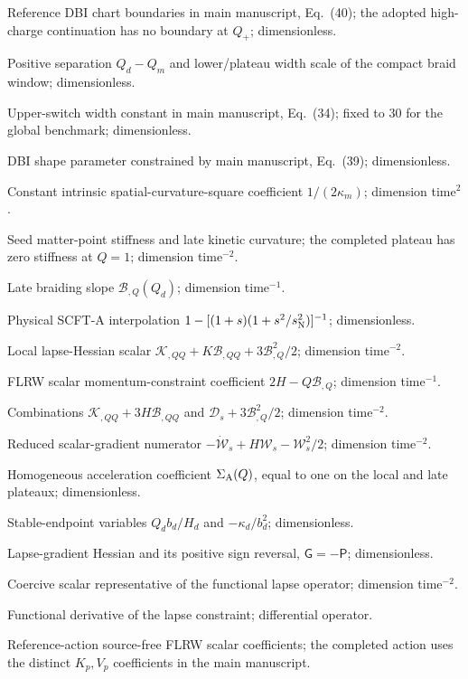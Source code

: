 \documentclass[aps,prd,reprint,onecolumn,notitlepage,nofootinbib,longbibliography,floatfix]{revtex4-2}
\theoremstyle{scstyle}
\theoremstyle{definition}
\theoremstyle{remark}
\newcommand{\cK}{\mathcal K}
\newcommand{\cB}{\mathcal B}
\newcommand{\cD}{\mathcal D}
\newcommand{\kap}{\kappa_m}
\newcommand{\etaR}{\eta_R}
\begin{document}
\begin{description}[style=nextline,leftmargin=3.2cm,labelwidth=2.8cm,font=\normalfont\bfseries]
\item[$Q_-,Q_+$] Reference DBI chart boundaries in main manuscript, Eq.~(40); the adopted high-charge continuation has no boundary at $Q_+$; dimensionless.
\item[$\Delta Q$] Positive separation $Q_d-Q_m$ and lower/plateau width scale of the compact braid window; dimensionless.
\item[$\nu_{\rm A}$] Upper-switch width constant in main manuscript, Eq.~(34); fixed to $30$ for the global benchmark; dimensionless.
\item[$\lambda_D$] DBI shape parameter constrained by main manuscript, Eq.~(39); dimensionless.
\item[$\etaR$] Constant intrinsic spatial-curvature-square coefficient $1/(2\kap)$; dimension time$^2$.
\item[$\kappa_m,\kappa_d$] Seed matter-point stiffness and late kinetic curvature; the completed plateau has zero stiffness at $Q=1$; dimension time$^{-2}$.
\item[$b_d$] Late braiding slope $\cB_{,Q}(Q_d)$; dimension time$^{-1}$.
\item[$\mu_{\rm A}(s)$] Physical SCFT-A interpolation $1-[(1+s)(1+s^2/s_{\rm N}^2)]^{-1}$; dimensionless.
\item[$\Xi$] Local lapse-Hessian scalar $\cK_{,QQ}+K\cB_{,QQ}+3\cB_{,Q}^2/2$; dimension time$^{-2}$.
\item[$\mathcal W_s$] FLRW scalar momentum-constraint coefficient $2H-Q\cB_{,Q}$; dimension time$^{-1}$.
\item[$\cD_s,\Xi_s$] Combinations $\cK_{,QQ}+3H\cB_{,QQ}$ and $\cD_s+3\cB_{,Q}^2/2$; dimension time$^{-2}$.
\item[$\mathcal C_s$] Reduced scalar-gradient numerator $-\dot{\mathcal W}_s+H\mathcal W_s-\mathcal W_s^2/2$; dimension time$^{-2}$.
\item[$\sigma_J$] Homogeneous acceleration coefficient $\Sigma_{\rm A}(Q)$, equal to one on the local and late plateaux; dimensionless.
\item[$r_d,\chi_d$] Stable-endpoint variables $Q_db_d/H_d$ and $-\kappa_d/b_d^2$; dimensionless.
\item[$\mathsf P^{ij},\mathsf G^{ij}$] Lapse-gradient Hessian and its positive sign reversal, $\mathsf G=-\mathsf P$; dimensionless.
\item[$\mathscr L_N$] Coercive scalar representative of the functional lapse operator; dimension time$^{-2}$.
\item[$\Delta_N$] Functional derivative of the lapse constraint; differential operator.
\item[$Q_s,F_s,c_s^2$] Reference-action source-free FLRW scalar coefficients; the completed action uses the distinct $K_p,V_p$ coefficients in the main manuscript.
\end{description}
\end{document}
